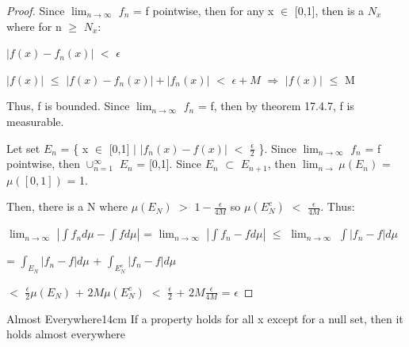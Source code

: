     \begin{proof}
        Since $\lim_{n \rightarrow \infty}$ $f_n$ = f pointwise, then
        for any x $\in$ [0,1], then is a $N_x$ where for n $\geq$ $N_x$:

        \hspace{0.5cm}
        $|f(x) - f_n(x)|$ $<$ $\epsilon$

        \hspace{0.5cm}
        $|f(x)|$ $\leq$ $|f(x) - f_n(x)| + |f_n(x)|$ $<$ $\epsilon + M$
        \hspace{1cm}
        $\Rightarrow$
        \hspace{1cm}
        $|f(x)|$ $\leq$ M

        Thus, f is bounded.
        Since $\lim_{n \rightarrow \infty}$ $f_n$ = f, then by
        {\color{red} theorem 17.4.7}, f is measurable.

        Let set $E_n$ = \{ x $\in$ [0,1] $|$
                            $|f_n(x) - f(x)|$ $<$ $\frac{\epsilon}{2}$ \}.
        Since $\lim_{n \rightarrow \infty}$ $f_n$ = f pointwise, then
        $\cup_{n=1}^{\infty}$ $E_n$ = [0,1].
        Since $E_n$ $\subset$ $E_{n+1}$, then
        $\lim_{n \rightarrow} \mu(E_n)$ = $\mu([0,1])$ = 1.

        Then, there is a N where $\mu(E_N)$ $>$ $1 - \frac{\epsilon}{4M}$
        so $\mu(E_N^c)$ $<$ $\frac{\epsilon}{4M}$. Thus:

        \hspace{0.5cm}
        $\lim_{n \rightarrow \infty}$ $|\int f_n d\mu - \int f d\mu|$
        = $\lim_{n \rightarrow \infty}$ $|\int f_n - f d\mu|$
        $\leq$ $\lim_{n \rightarrow \infty}$ $\int |f_n - f| d\mu$

        \hspace{5.25cm}
        = $\int_{E_N} |f_n - f| d\mu$ + $\int_{E_N^c} |f_n - f| d\mu$

        \hspace{5.25cm}
        $<$ $\frac{\epsilon}{2} \mu(E_N)$ + $2M \mu(E_N^c)$
        $<$ $\frac{\epsilon}{2}$ + $2M \frac{\epsilon}{4M}$
        = $\epsilon$
    \end{proof}

    \vspace{0.5cm}



    \begin{definition}{Almost Everywhere}{14cm}
        If a property holds for all x except for a null set,
        then it holds {\color{lblue} almost everywhere}
    \end{definition}

